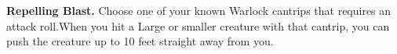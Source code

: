 \textbf{Repelling Blast.} Choose one of your known Warlock cantrips that requires an attack roll.\fmarkprev When you hit a Large or smaller creature with that cantrip, you can push the creature up to 10 feet straight away from you.

